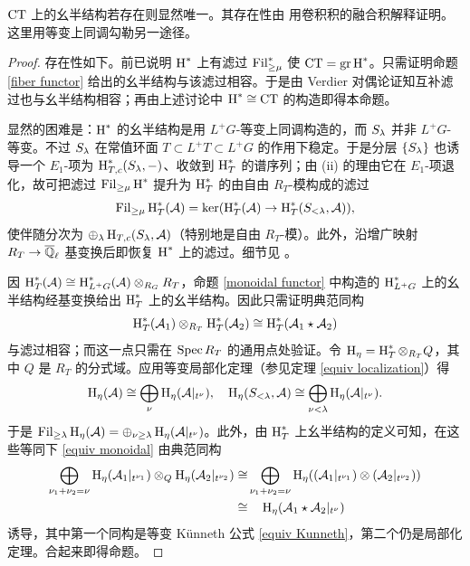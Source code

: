 $\operatorname{CT}$ 上的幺半结构若存在则显然唯一。其存在性由 \cite[Proposition 6.4]{MV} 用卷积积的融合积解释证明。这里用等变上同调勾勒另一途径。

\begin{proof}
存在性如下。前已说明 $\operatorname{H}^*$ 上有滤过 $\operatorname{Fil}^*_{\geq \mu}$ 使 $\operatorname{CT}=\operatorname{gr}\operatorname{H}^*$。只需证明命题 \ref{fiber functor} 给出的幺半结构与该滤过相容。于是由 Verdier 对偶论证知互补滤过也与幺半结构相容；再由上述讨论中 $\operatorname{H}^*\cong \operatorname{CT}$ 的构造即得本命题。

显然的困难是：$\operatorname{H}^*$ 的幺半结构是用 $L^+G$-等变上同调构造的，而 $S_{\lambda}$ 并非 $L^+G$-等变。不过 $S_{\lambda}$ 在常值环面 $T\subset L^+T\subset L^+G$ 的作用下稳定。于是分层 $\{S_{\lambda}\}$ 也诱导一个 $E_1$-项为 $\operatorname{H}_{T,c}^*(S_{\lambda},-)$、收敛到 $\operatorname{H}^*_{T}$ 的谱序列；由 (ii) 的理由它在 $E_1$-项退化，故可把滤过 $\operatorname{Fil}_{\geq \mu}\operatorname{H}^*$ 提升为 $\operatorname{H}^*_{T}$ 的由自由 $R_{T}$-模构成的滤过
\[\operatorname{Fil}_{\geq \mu}\operatorname{H}_{T}^*({\mathcal A})=\ker(\operatorname{H}_{T}^*({\mathcal A})\to \operatorname{H}_{T}^*(S_{<{\lambda}},{\mathcal A})),\]
使伴随分次为 $\oplus_{\lambda}\operatorname{H}_{T,c}(S_{\lambda},{\mathcal A})$（特别地是自由 $R_{T}$-模）。此外，沿增广映射 $R_{T}\to{\overline{{\mathbb Q}}_\ell}$ 基变换后即恢复 $\operatorname{H}^*$ 上的滤过。细节见 \cite[\S\ 2.2]{YZ}。

因 $\operatorname{H}_{T}^*({\mathcal A})\cong \operatorname{H}^*_{L^+G}({\mathcal A})\otimes_{R_{G}}R_{T}$，命题 \ref{monoidal functor} 中构造的 $\operatorname{H}_{L^+G}^*$ 上的幺半结构经基变换给出 $\operatorname{H}_{T}^*$ 上的幺半结构。因此只需证明典范同构
\begin{equation}\label{equiv monoidal}
\operatorname{H}^*_{T}({\mathcal A}_1)\otimes_{R_{T}}\operatorname{H}^*_{T}({\mathcal A}_2)\cong \operatorname{H}^*_{T}({\mathcal A}_1\star{\mathcal A}_2)
\end{equation}
与滤过相容；而这一点只需在 $\operatorname{Spec} R_{T}$ 的通用点处验证。令 $\operatorname{H}_\eta=\operatorname{H}^*_{T}\otimes_{R_{T}}Q$，其中 $Q$ 是 $R_{T}$ 的分式域。应用等变局部化定理（参见定理 \ref{equiv localization}）得
\[\operatorname{H}_\eta({\mathcal A})\cong \bigoplus_\nu \operatorname{H}_\eta({\mathcal A}|_{t^\nu}),\quad \operatorname{H}_\eta(S_{<{\lambda}},{\mathcal A})\cong\bigoplus_{\nu<{\lambda}}\operatorname{H}_\eta({\mathcal A}|_{t^\nu}).\]
于是 $\operatorname{Fil}_{\geq {\lambda}}\operatorname{H}_\eta({\mathcal A})=\oplus_{\nu\geq {\lambda}}\operatorname{H}_\eta({\mathcal A}|_{t^\nu})$。此外，由 $\operatorname{H}^*_{T}$ 上幺半结构的定义可知，在这些等同下 \eqref{equiv monoidal} 由典范同构
\[\begin{split}\bigoplus_{\nu_1+\nu_2=\nu} \operatorname{H}_\eta({\mathcal A}_1|_{t^{\nu_1}})\otimes_Q \operatorname{H}_\eta({\mathcal A}_2|_{t^{\nu_2}})\cong &\bigoplus_{\nu_1+\nu_2=\nu}\operatorname{H}_\eta(({\mathcal A}_1|_{t^{\nu_1}})\otimes ({\mathcal A}_2|_{t^{\nu_2}})) \\
\cong &\quad \operatorname{H}_\eta({\mathcal A}_1\star{\mathcal A}_2|_{t^\nu})\end{split}\]
诱导，其中第一个同构是等变 K\"unneth 公式 \eqref{equiv Kunneth}，第二个仍是局部化定理。合起来即得命题。
\end{proof}

